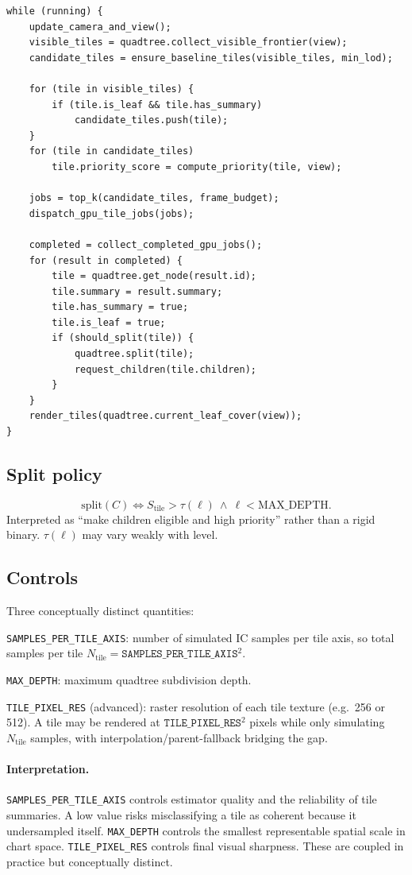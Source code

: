 \documentclass[11pt]{report}
\begin{document}
\begin{verbatim}
while (running) {
    update_camera_and_view();
    visible_tiles = quadtree.collect_visible_frontier(view);
    candidate_tiles = ensure_baseline_tiles(visible_tiles, min_lod);

    for (tile in visible_tiles) {
        if (tile.is_leaf && tile.has_summary)
            candidate_tiles.push(tile);
    }
    for (tile in candidate_tiles)
        tile.priority_score = compute_priority(tile, view);

    jobs = top_k(candidate_tiles, frame_budget);
    dispatch_gpu_tile_jobs(jobs);

    completed = collect_completed_gpu_jobs();
    for (result in completed) {
        tile = quadtree.get_node(result.id);
        tile.summary = result.summary;
        tile.has_summary = true;
        tile.is_leaf = true;
        if (should_split(tile)) {
            quadtree.split(tile);
            request_children(tile.children);
        }
    }
    render_tiles(quadtree.current_leaf_cover(view));
}
\end{verbatim}

\subsection{Split policy}

\[
\text{split}(C) \iff S_{\text{tile}}>\tau(\ell)\ \wedge\ \ell < \text{MAX\_DEPTH}.
\]
Interpreted as ``make children eligible and high priority'' rather than a rigid binary. $\tau(\ell)$ may vary weakly with level.

\subsection{Controls}

Three conceptually distinct quantities:

\texttt{SAMPLES\_PER\_TILE\_AXIS}: number of simulated IC samples per tile axis, so total samples per tile $N_{\mathrm{tile}}=\texttt{SAMPLES\_PER\_TILE\_AXIS}^2$.

\texttt{MAX\_DEPTH}: maximum quadtree subdivision depth.

\texttt{TILE\_PIXEL\_RES} (advanced): raster resolution of each tile texture (e.g.\ 256 or 512). A tile may be rendered at $\texttt{TILE\_PIXEL\_RES}^2$ pixels while only simulating $N_{\mathrm{tile}}$ samples, with interpolation/parent-fallback bridging the gap.

\paragraph{Interpretation.} \texttt{SAMPLES\_PER\_TILE\_AXIS} controls estimator quality and the reliability of tile summaries. A low value risks misclassifying a tile as coherent because it undersampled itself. \texttt{MAX\_DEPTH} controls the smallest representable spatial scale in chart space. \texttt{TILE\_PIXEL\_RES} controls final visual sharpness. These are coupled in practice but conceptually distinct.
\end{document}
